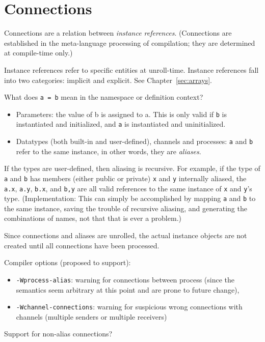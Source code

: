 

\chapter{Connections}
\label{sec:connections}

Connections are a relation between \emph{instance references}.  
(Connections are established in the meta-language processing 
of compilation; they are determined at compile-time only.)

Instance references refer to specific entities at unroll-time.  
Instance references fall into two categories: implicit and explicit.  
See Chapter~\ref{sec:arrays}.  

What does \verb|a = b| mean in the namespace or definition context?

\begin{itemize}
\item Parameters: the value of b is assigned to a.
	This is only valid if \verb|b| is instantiated and initialized, 
	and \verb|a| is instantiated and uninitialized.  
\item Datatypes (both built-in and user-defined), channels and processes:
	\verb|a| and \verb|b| refer to the same instance, in other words, 
	they are \emph{aliases}.
\end{itemize}

If the types are user-defined, then aliasing is recursive.  
For example, if the type of \verb|a| and \verb|b| has 
members (either public or private) \verb|x| and \verb|y| internally aliased, 
the \verb|a.x|, \verb|a.y|, \verb|b.x|, and \verb|b,y| are all 
valid references to the same instance of \verb|x| and \verb|y|'s type.  
(Implementation:
This can simply be accomplished by mapping \verb|a| and \verb|b|
to the same instance, saving the trouble of recursive aliasing, 
and generating the combinations of names, 
not that that is ever a problem.)

Since connections and aliases are unrolled, the actual instance objects 
are not created until all connections have been processed.  

Compiler options (proposed to support):
\begin{itemize}
\item \verb|-Wprocess-alias|:
	warning for connections between process
	(since the semantics seem arbitrary at this point and 
	are prone to future change), 
\item \verb|-Wchannel-connections|: 
	warning for suspicious wrong connections with channels
	(multiple senders or multiple receivers)
\end{itemize}


Support for non-alias connections?

